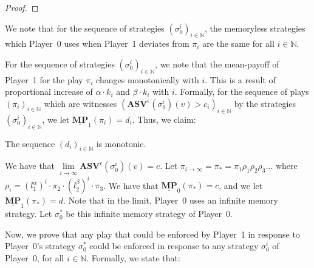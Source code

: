 \begin{proof}
\end{proof}

\begin{remark} 
    \label{RemarkStratEqual} 
    We note that for the sequence of strategies $(\sigma_0^i)_{i \in \mathbb{N}}$, the memoryless strategies which Player~0 uses when Player~1 deviates from $\pi_i$ are the same for all $i \in \mathbb{N}$.
\end{remark}

For the sequence of strategies $(\sigma_0^i)_{i \in \mathbb{N}}$, we note that the mean-payoff of Player~1 for the play $\pi_i$ changes monotonically with $i$. This is a result of proportional increase of $\alpha \cdot k_i$ and $\beta \cdot k_i$ with $i$. Formally, for the sequence of plays $(\pi_i)_{i \in \mathbb{N}}$ which are witnesses $(\mathbf{ASV}^{\epsilon}(\sigma_0^i)(v) > c_i)_{i \in \mathbb{N}}$ by the strategies $(\sigma_0^i)_{i \in \mathbb{N}}$, we let $\underline{\mathbf{MP}}_1(\pi_i) = d_i$. Thus, we claim:

\begin{proposition}
    \label{PropMonotonicDi}
    The sequence $(d_i)_{i \in \mathbb{N}}$ is monotonic. 
\end{proposition}

We have that $\lim \limits_{i \to \infty} \mathbf{ASV}^{\epsilon}(\sigma_0^i)(v) = c$. Let $\pi_{i \to \infty} = \pi_* = \pi_1 \rho_1 \rho_2 \rho_3 \dotsc$ where $\rho_i = (l^{\alpha}_{1})^i \cdot \pi_{2} \cdot (l^{\beta}_{2})^i \cdot \pi_{3}$. We have that $\underline{\mathbf{MP}}_0(\pi_*) = c$, and we let $\underline{\mathbf{MP}}_1(\pi_*) = d$. Note that in the limit, Player~0 uses an infinite memory strategy. Let $\sigma_0^*$ be this infinite memory strategy of Player~0.

Now, we prove that any play that could be enforced by Player~1 in response to Player~0's strategy $\sigma_0^*$ could be enforced in response to any strategy $\sigma_0^i$ of Player~0, for all $i \in \mathbb{N}$. Formally, we state that:

